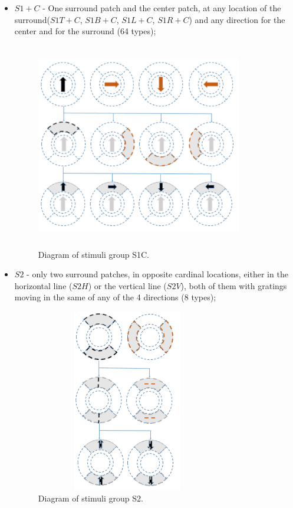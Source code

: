 \begin{itemize}
\item $S1+C$ - One surround patch and the center patch, at any location of the surround($S1T+C$, $S1B+C$, $S1L+C$, $S1R+C$) and any direction for the center and for the surround (64 types);

\begin{figure}[H] \centering \includegraphics[width=9cm,height=9cm,keepaspectratio]{Figures/4.Chapter/S1C.PNG} \caption{Diagram of stimuli group S1C.} \end{figure}

\item $S2$ - only two surround patches, in opposite cardinal locations, either in the horizontal line ($S2H$) or the vertical line ($S2V$), both of them with gratings moving in the same of any of the 4 directions (8 types);

\begin{figure}[H] \centering \includegraphics[width=8cm,height=8cm,keepaspectratio]{Figures/4.Chapter/S2.PNG} \caption{Diagram of stimuli group S2.} \end{figure}


\end{itemize}
